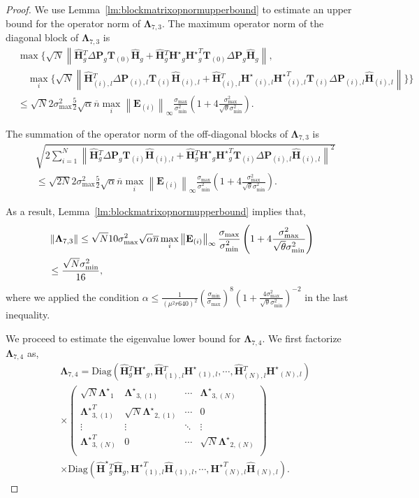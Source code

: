\documentclass[twoside,11pt]{article}
\newcommand{\norm}[1]{\left\lVert#1\right\rVert}
\newcommand{\matE}{\mathbf{E}}
\newcommand{\hmatHst}{{\hat{\mathbf{H}}}^{\star}{}}
\newcommand{\hmatH}{{\hat{\mathbf{H}}}{}}
\newcommand{\matHst}{{\mathbf{H}^\star}}
\newcommand{\matP}{\mathbf{P}}
\newcommand{\matT}{\mathbf{T}}
\newcommand{\matLambda}{\mathbf{\Lambda}}
\newcommand{\matLambdast}{{\mathbf{\Lambda}^\star}}
\newcommand{\gop}{\sigma_{\max}}
\newcommand{\bn}{{\overline{n}}}
\newcommand{\sabnb}{\sqrt{\alpha} \bn\max_{i}\norm{\matE_{(i)}}_{\infty}}
\newcommand{\sm}{\sigma_{\min}}
\newcommand{\sms}{\sigma_{\min}^2}
\begin{document}
\begin{proof}
We use Lemma~\ref{lm:blockmatrixopnormupperbound} to estimate an upper bound for the operator norm of $\matLambda_{7,3}$. The maximum operator norm of the diagonal block of $\matLambda_{7,3}$ is
\begin{align*}
    &\max\{\sqrt{N}\norm{\hmatH_g^T\Delta\matP_{g}\matT_{(0)}\hmatH_g+\hmatH_g^T\matHst_g\matHst_g^T\matT_{(0)}\Delta\matP_{g}\hmatH_g}, \\
    &\quad\max_{i}\{\sqrt{N}\norm{\hmatH_{(i),l}^T\Delta\matP_{{(i),l}}\matT_{(i)}\hmatH_{(i),l}+\hmatH_{(i),l}^T\matHst_{(i),l}\matHst_{(i),l}^T\matT_{(i)}\Delta\matP_{(i),l}\hmatH_{(i),l}} \}\}\\
    &\le \sqrt{N} 2 \gop^2\frac{5}{2}\sabnb\frac{\gop}{\sms}\left(1+4\frac{\gop^2}{\sqrt{\theta}\sms}\right).
\end{align*}

The summation of the operator norm of the off-diagonal blocks of $\matLambda_{7,3}$ is
\begin{align*}
  &\sqrt{2\sum_{i=1}^N \norm{\hmatH_g^T\Delta\matP_{g}\matT_{(i)}\hmatH_{(i),l}+\hmatH_g^T\matHst_g\matHst_g^T\matT_{(i)}\Delta\matP_{(i),l}\hmatH_{(i),l}}^2}\\
  &\le \sqrt{2N}2 \gop^2\frac{5}{2}\sabnb\frac{\gop}{\sms}\left(1+4\frac{\gop^2}{\sqrt{\theta}\sms}\right). 
\end{align*}

As a result, Lemma~\ref{lm:blockmatrixopnormupperbound} implies that,
\begin{align}
    &\norm{\matLambda_{7,3}}\le \sqrt{N}10\gop^2\sabnb\frac{\gop}{\sms}\left(1+4\frac{\gop^2}{\sqrt{\theta}\sms}\right)\notag\\
    &\le \frac{\sqrt{N}\sms}{16},\notag\\
    \label{eqn:l73upper}
\end{align}
where we applied the condition $\alpha\le \frac{1}{\left(\mu^2r640\right)^2}\left(\frac{\sm}{\gop}\right)^8\left(1+\frac{4\gop^2}{\sqrt{\theta}\sms}\right)^{-2}$ in the last inequality.

We proceed to estimate the eigenvalue lower bound for $\matLambda_{7,4}$. We first factorize $\matLambda_{7,4}$ as,
\begin{align*}
&\matLambda_{7,4} = \text{Diag}\left(\hmatH_g^T\matHst_g,\hmatH_{(1),l}^T\matHst_{(1),l},\cdots,\hmatH_{(N),l}^T\matHst_{(N),l} \right)\\
&\times \begin{pmatrix}
    \sqrt{N}\matLambdast_1 & \matLambdast_{3,(1)}&\cdots&\matLambdast_{3,(N)}\\
    \matLambdast_{3,(1)}^T&\sqrt{N}\matLambdast_{2,(1)}&\cdots&0\\
    \vdots&\vdots&\ddots&\vdots\\
    \matLambdast_{3,(N)}^T&0&\cdots&\sqrt{N}\matLambdast_{2,(N)}\\
   \end{pmatrix}\\
   &\times \text{Diag}\left(\hmatHst_g^T\hmatH_g,\matHst_{(1),l}^T\hmatH_{(1),l},\cdots,\matHst_{(N),l}^T\hmatH_{(N),l} \right).
\end{align*}


\end{proof}
\end{document}
